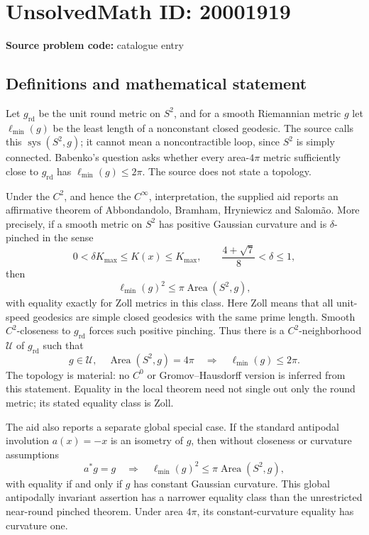 \documentclass[11pt]{article}
\begin{document}
\section*{UnsolvedMath ID: 20001919}
\textbf{Source problem code:} catalogue entry
\subsection{Definitions and mathematical statement}
Let \(g_{\mathrm{rd}}\) be the unit round metric on \(S^2\), and for a smooth Riemannian metric \(g\) let \(\ell_{\min}(g)\) be the least length of a nonconstant closed geodesic. The source calls this \(\operatorname{sys}(S^2,g)\); it cannot mean a noncontractible loop, since \(S^2\) is simply connected. Babenko's question asks whether every area-\(4\pi\) metric sufficiently close to \(g_{\mathrm{rd}}\) has \(\ell_{\min}(g)\leq2\pi\). The source does not state a topology.

Under the \(C^2\), and hence the \(C^\infty\), interpretation, the supplied aid reports an affirmative theorem of Abbondandolo, Bramham, Hryniewicz and Salomão. More precisely, if a smooth metric on \(S^2\) has positive Gaussian curvature and is \(\delta\)-pinched in the sense
\[
 0<\delta K_{\max}\leq K(x)\leq K_{\max},
 \qquad \frac{4+\sqrt7}{8}<\delta\leq1,
\]
then
\[
 \ell_{\min}(g)^2\leq\pi\operatorname{Area}(S^2,g),
\]
with equality exactly for Zoll metrics in this class. Here Zoll means that all unit-speed geodesics are simple closed geodesics with the same prime length. Smooth \(C^2\)-closeness to \(g_{\mathrm{rd}}\) forces such positive pinching. Thus there is a \(C^2\)-neighborhood \(\mathcal U\) of \(g_{\mathrm{rd}}\) such that
\[
 g\in\mathcal U,\quad\operatorname{Area}(S^2,g)=4\pi
 \quad\Longrightarrow\quad\ell_{\min}(g)\leq2\pi.
\]
The topology is material: no \(C^0\) or Gromov--Hausdorff version is inferred from this statement. Equality in the local theorem need not single out only the round metric; its stated equality class is Zoll.

The aid also reports a separate global special case. If the standard antipodal involution \(a(x)=-x\) is an isometry of \(g\), then without closeness or curvature assumptions
\[
 a^*g=g\quad\Longrightarrow\quad
 \ell_{\min}(g)^2\leq\pi\operatorname{Area}(S^2,g),
\]
with equality if and only if \(g\) has constant Gaussian curvature. This global antipodally invariant assertion has a narrower equality class than the unrestricted near-round pinched theorem. Under area \(4\pi\), its constant-curvature equality has curvature one.
\end{document}
